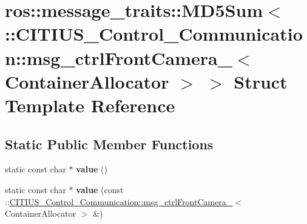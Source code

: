 \hypertarget{structros_1_1message__traits_1_1_m_d5_sum_3_01_1_1_c_i_t_i_u_s___control___communication_1_1msg_2297bd9bc71bdea83030df67493dd5bb}{\section{ros\-:\-:message\-\_\-traits\-:\-:\-M\-D5\-Sum$<$ \-:\-:\-C\-I\-T\-I\-U\-S\-\_\-\-Control\-\_\-\-Communication\-:\-:msg\-\_\-ctrl\-Front\-Camera\-\_\-$<$ \-Container\-Allocator $>$ $>$ \-Struct \-Template \-Reference}
\label{structros_1_1message__traits_1_1_m_d5_sum_3_01_1_1_c_i_t_i_u_s___control___communication_1_1msg_2297bd9bc71bdea83030df67493dd5bb}
}
\subsection*{\-Static \-Public \-Member \-Functions}
\begin{DoxyCompactItemize}
\item 
\hypertarget{structros_1_1message__traits_1_1_m_d5_sum_3_01_1_1_c_i_t_i_u_s___control___communication_1_1msg_2297bd9bc71bdea83030df67493dd5bb_a0278ce350823999f112f1cdf4aa1bedf}{static const char $\ast$ {\bfseries value} ()}\label{structros_1_1message__traits_1_1_m_d5_sum_3_01_1_1_c_i_t_i_u_s___control___communication_1_1msg_2297bd9bc71bdea83030df67493dd5bb_a0278ce350823999f112f1cdf4aa1bedf}

\item 
\hypertarget{structros_1_1message__traits_1_1_m_d5_sum_3_01_1_1_c_i_t_i_u_s___control___communication_1_1msg_2297bd9bc71bdea83030df67493dd5bb_a5f00169c07927a222944b674b4f8a85c}{static const char $\ast$ {\bfseries value} (const \-::\hyperlink{struct_c_i_t_i_u_s___control___communication_1_1msg__ctrl_front_camera__}{\-C\-I\-T\-I\-U\-S\-\_\-\-Control\-\_\-\-Communication\-::msg\-\_\-ctrl\-Front\-Camera\-\_\-}$<$ \-Container\-Allocator $>$ \&)}\label{structros_1_1message__traits_1_1_m_d5_sum_3_01_1_1_c_i_t_i_u_s___control___communication_1_1msg_2297bd9bc71bdea83030df67493dd5bb_a5f00169c07927a222944b674b4f8a85c}

\end{DoxyCompactItemize}
